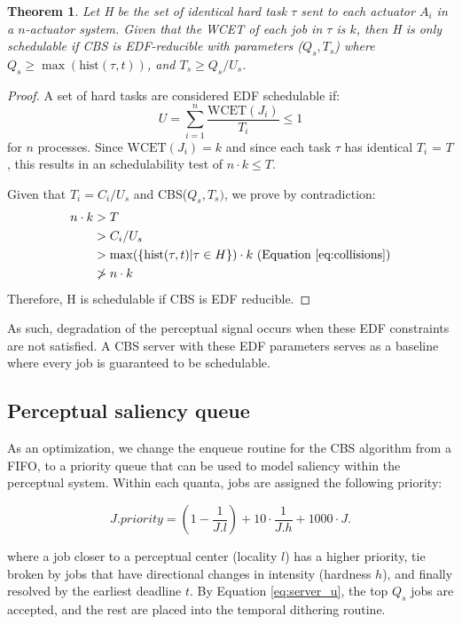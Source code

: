 \documentclass{sigchi}
\newtheorem{theorem}{Theorem}
\begin{document}
  \begin{theorem}
     Let H be the set of identical hard task $\tau$  sent to each actuator $A_i$ in a $n$-actuator system. Given that the WCET of each job in $\tau$ is $k$, then H is only schedulable if CBS is EDF-reducible with parameters ($Q_s, T_s$) where
     $Q_s \ge \max(\text{hist}(\tau, t))$, and $T_s \ge Q_s / U_s $. 
  \end{theorem}


  \begin{proof}
    A set of hard tasks are considered EDF schedulable \cite{xu_scheduling_1990} if: 
    \begin{equation}
      U = \sum_{i=1}^n \frac{\text{WCET}(J_i)}{T_i} \leq 1
    \end{equation}
    for $n$ processes. Since $\text{WCET}(J_i) = k$ and since each task $\tau$ has identical $T_i$ = $T$, this results in an schedulability test of $n \cdot k \leq T$.

    Given that $T_i = C_i / U_s$ \cite{abeni_integrating_1998} and CBS($Q_s, T_s)$, we prove by contradiction: 
    \begin{align*}
      n \cdot k &> T\\
           &> C_i / U_s \\
           &> \max(\{\text{hist}(\tau, t) \vert \tau \in H \}) \cdot k \text{ (Equation } \ref{eq:collisions})\\ 
           &\ngtr n \cdot k
    \end{align*}
    Therefore, H is schedulable if CBS is EDF reducible. 
  \end{proof}

  As such, degradation of the perceptual signal occurs when these EDF constraints are not satisfied. A CBS server with these EDF parameters serves as a baseline where every job is guaranteed to be schedulable. 

  \subsection{Perceptual saliency queue}
  As an optimization, we change the enqueue routine for the CBS algorithm from a FIFO, to a priority queue that can be used to model saliency within the perceptual system. Within each quanta, jobs are assigned the following priority:

  $$ J.priority =  (1 - \frac{1}{J.l}) + 10 \cdot \frac{1}{J.h} + 1000 \cdot J.$$

  where a job closer to a perceptual center (locality $l$) has a higher priority, tie broken by jobs that have directional changes in intensity (hardness $h$), and finally resolved by the earliest deadline $t$. By Equation \ref{eq:server_u}, the top $Q_s$ jobs are accepted, and the rest are placed into the temporal dithering routine. 
\end{document}
